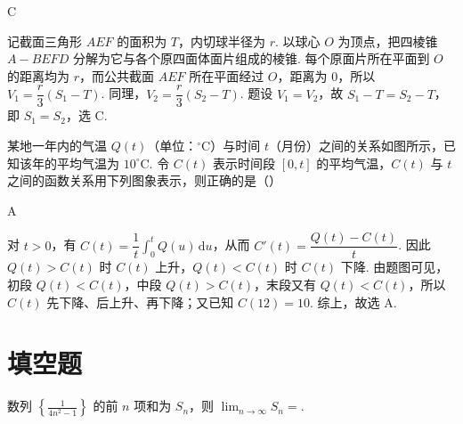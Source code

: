 \begin{answer}
C
\end{answer}

\begin{solution}
记截面三角形 \(AEF\) 的面积为 \(T\)，内切球半径为 \(r\). 以球心 \(O\) 为顶点，把四棱锥 \(A-BEFD\) 分解为它与各个原四面体面片组成的棱锥. 每个原面片所在平面到 \(O\) 的距离均为 \(r\)，而公共截面 \(AEF\) 所在平面经过 \(O\)，距离为 \(0\)，所以
\(V_1=\dfrac r3(S_1-T)\). 同理，\(V_2=\dfrac r3(S_2-T)\). 题设 \(V_1=V_2\)，故 \(S_1-T=S_2-T\)，即 \(S_1=S_2\)，选 C.
\end{solution}

\begin{problem}
某地一年内的气温 \(Q(t)\)（单位：\(^{\circ} \mathrm{C}\)）与时间 \(t\)（月份）之间的关系如图所示，已知该年的平均气温为 \(10^{\circ} \mathrm{C}\). 令 \(C(t)\) 表示时间段 \([0, t]\) 的平均气温，\(C(t)\) 与 \(t\) 之间的函数关系用下列图象表示，则正确的是（\quad）


    {}
    {}
    {}
\end{problem}

\begin{answer}
A
\end{answer}

\begin{solution}
对 \(t>0\)，有 \(C(t)=\dfrac1t\int_0^tQ(u)\,\mathrm du\)，从而
\(C'(t)=\dfrac{Q(t)-C(t)}{t}\). 因此 \(Q(t)>C(t)\) 时 \(C(t)\) 上升，\(Q(t)<C(t)\) 时 \(C(t)\) 下降. 由题图可见，初段 \(Q(t)<C(t)\)，中段 \(Q(t)>C(t)\)，末段又有 \(Q(t)<C(t)\)，所以 \(C(t)\) 先下降、后上升、再下降；又已知 \(C(12)=10\). 综上，故选 A.
\end{solution}

\section{填空题}
\begin{problem}
数列 \( \left\{\frac{1}{4n^{2}-1}\right\} \) 的前 \(n\) 项和为 \( S_{n} \)，则 \(\displaystyle\lim_{n\to\infty} S_{n} = \)\fillinblank{}.
\end{problem}

